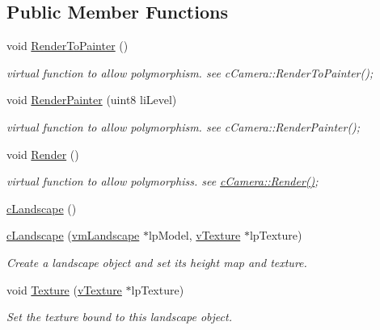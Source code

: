 \subsection*{Public Member Functions}
\begin{DoxyCompactItemize}
\item 
void \hyperlink{classc_landscape_acc1d4843ba2d7be80272d3f50d1599d5}{RenderToPainter} ()
\begin{DoxyCompactList}\small\item\em virtual function to allow polymorphism. see cCamera::RenderToPainter(); \item\end{DoxyCompactList}\item 
void \hyperlink{classc_landscape_a9599678bb07612fc7a922174f19b27a1}{RenderPainter} (uint8 liLevel)
\begin{DoxyCompactList}\small\item\em virtual function to allow polymorphism. see cCamera::RenderPainter(); \item\end{DoxyCompactList}\item 
void \hyperlink{classc_landscape_a8e2448f2d2203f3823d786e9e0450508}{Render} ()
\begin{DoxyCompactList}\small\item\em virtual function to allow polymorphiss. see \hyperlink{classc_camera_acfe96d0953540fa3938e4d415d7cb791}{cCamera::Render()}; \item\end{DoxyCompactList}\item 
\hyperlink{classc_landscape_aeaf9fe017cc63aa75ccc294004b5cc6b}{cLandscape} ()
\item 
\hyperlink{classc_landscape_a324bd9f8d586259843d9d9d0cf1fe4e5}{cLandscape} (\hyperlink{classvm_landscape}{vmLandscape} $\ast$lpModel, \hyperlink{classv_texture}{vTexture} $\ast$lpTexture)
\begin{DoxyCompactList}\small\item\em Create a landscape object and set its height map and texture. \item\end{DoxyCompactList}\item 
void \hyperlink{classc_landscape_a780a1ccba6f6abc3fa429196d039689a}{Texture} (\hyperlink{classv_texture}{vTexture} $\ast$lpTexture)
\begin{DoxyCompactList}\small\item\em Set the texture bound to this landscape object. \item\end{DoxyCompactList}\item 

\end{DoxyCompactItemize}
